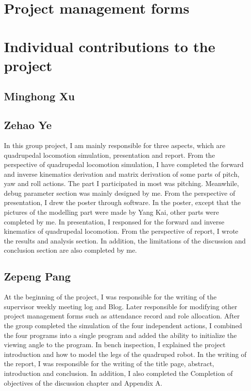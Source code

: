 \newpage
\appendix
\appendixpage
\addappheadtotoc

\chapter{Project management forms}








\chapter{Individual contributions to the project}
\section{Minghong Xu}
\section{Zehao Ye}
In this group project, I am mainly responsible for three aspects, which are quadrupedal locomotion simulation, presentation and report. From the perspective of quadrupedal locomotion simulation, I have completed the forward and inverse kinematics derivation and matrix derivation of some parts of pitch, yaw and roll actions. The part I participated in most was pitching. Meanwhile, debug parameter section was mainly designed by me. From the perspective of presentation, I drew the poster through software. In the poster, except that the pictures of the modelling part were made by Yang Kai, other parts were completed by me. In presentation, I responsed for the forward and inverse kinematics of quadrupedal locomotion. From the perspective of report, I wrote the results and analysis section. In addition, the limitations of the discussion and conclusion section are also completed by me.

\section{Zepeng Pang}

At the beginning of the project, I was responsible for the writing of the supervisor weekly meeting log and Blog. Later responsible for modifying other project management forms such as attendance record and role allocation. After the group completed the simulation of the four independent actions, I combined the four programs into a single program and added the ability to initialize the viewing angle to the program. In bench inspection, I explained the project introduction and how to model the legs of the quadruped robot. In the writing of the report, I was responsible for the writing of the title page, abstract, introduction and conclusion. In addition, I also completed the Completion of objectives of the discussion chapter and Appendix A.

